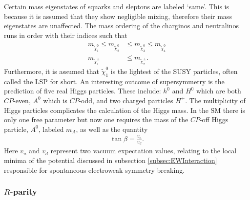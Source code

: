 \noindent Certain mass eigenstates of squarks and sleptons are labeled `same'.
This is because it is assumed that they show negligible mixing, therefore their mass eigenstates are unaffected.
The mass ordering of the charginos and neutralinos runs in order with their indices such that
\begin{align}
m_{\tilde{\chi}^{0}_{1}} \leq m_{\tilde{\chi}^{0}_{2}} &\leq m_{\tilde{\chi}^{0}_{3}} \leq m_{\tilde{\chi}^{0}_{4}} \\
m_{\tilde{\chi}^{\pm}_{1}} &\leq m_{\tilde{\chi}^{\pm}_{2}}.
\end{align}
Furthermore, it is assumed that $\tilde{\chi}^{0}_{1}$ is the lightest of the SUSY particles, often called the LSP for short.
An interesting outcome of supersymmetry is the prediction of five real Higgs particles.
These include: $h^{0}$ and $H^{0}$ which are both $CP$-even, $A^{0}$ which is $CP$-odd, and two charged particles $H^{\pm}$.
The multiplicity of Higgs particles complicates the calculation of the Higgs mass. 
In the SM there is only one free parameter but now one requires the mass of the $CP$-off Higgs particle, $A^{0}$, labeled $m_{A}$, as well as the quantity
\begin{align}
\tan \beta = \frac{v_{u}}{v_{d}}.
\label{eqn:HiggsParameter}
\end{align}
Here $v_{u}$ and $v_{d}$ represent two vacuum expectation values, relating to the local minima of the potential discussed in subsection \ref{subsec:EWInteraction} responsible for spontaneous electroweak symmetry breaking.

\subsubsection{$R$-parity}  


